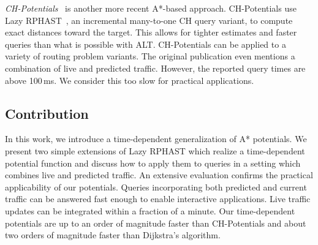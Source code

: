 \documentclass[a4paper,UKenglish,cleveref, autoref, thm-restate,anonymous]{lipics-v2021}
\begin{document}
\emph{CH-Potentials}~\cite{strasser_et_al:LIPIcs.SEA.2021.6} is another more recent A*-based approach.
CH-Potentials use Lazy RPHAST~\cite{strasser_et_al:LIPIcs.SEA.2021.6}, an incremental many-to-one CH query variant, to compute exact distances toward the target.
This allows for tighter estimates and faster queries than what is possible with ALT.
CH-Potentials can be applied to a variety of routing problem variants.
The original publication even mentions a combination of live and predicted traffic.
However, the reported query times are above 100\,ms.
We consider this too slow for practical applications.

\subsection{Contribution}

In this work, we introduce a time-dependent generalization of A* potentials.
We present two simple extensions of Lazy RPHAST which realize a time-dependent potential function and discuss how to apply them to queries in a setting which combines live and predicted traffic.
An extensive evaluation confirms the practical applicability of our potentials.
Queries incorporating both predicted and current traffic can be answered fast enough to enable interactive applications.
Live traffic updates can be integrated within a fraction of a minute.
Our time-dependent potentials are up to an order of magnitude faster than CH-Potentials and about two orders of magnitude faster than Dijkstra's algorithm.
\end{document}
